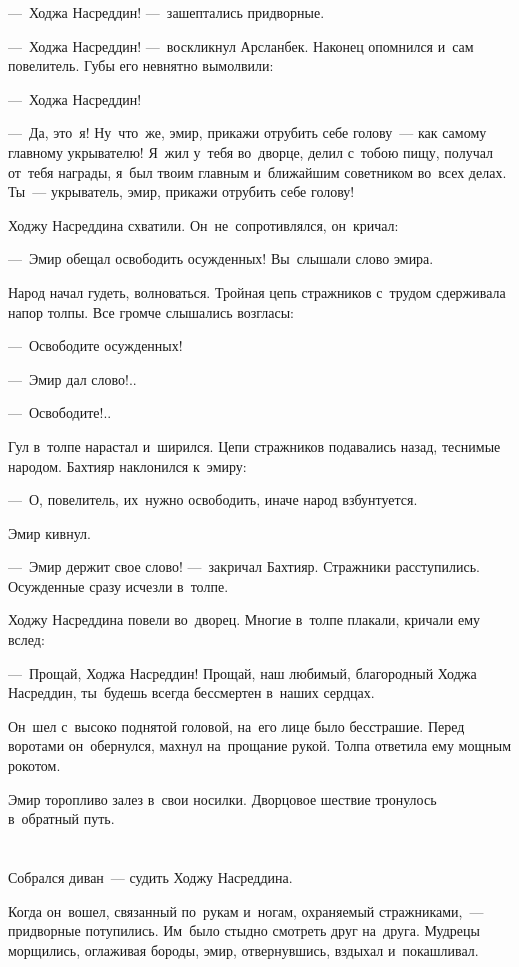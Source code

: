 \documentclass[12pt,a4paper]{book}
\begin{document}
—~Ходжа Насреддин! —~зашептались придворные.

—~Ходжа Насреддин! —~воскликнул Арсланбек. Наконец опомнился и~сам повелитель. Губы его невнятно вымолвили:

—~Ходжа Насреддин!

—~Да, это~я! Ну~что~же, эмир, прикажи отрубить себе голову~— как самому главному укрывателю! Я~жил у~тебя во~дворце, делил с~тобою пищу, получал от~тебя награды, я~был твоим главным и~ближайшим советником во~всех делах. Ты~— укрыватель, эмир, прикажи отрубить себе голову!

Ходжу Насреддина схватили. Он~не~сопротивлялся, он~кричал:

—~Эмир обещал освободить осужденных! Вы~слышали слово эмира.

Народ начал гудеть, волноваться. Тройная цепь стражников с~трудом сдерживала напор толпы. Все громче слышались возгласы:

—~Освободите осужденных!

—~Эмир дал слово!..

—~Освободите!..

Гул в~толпе нарастал и~ширился. Цепи стражников подавались назад, теснимые народом. Бахтияр наклонился к~эмиру:

—~О, повелитель, их~нужно освободить, иначе народ взбунтуется.

Эмир кивнул.

—~Эмир держит свое слово! —~закричал Бахтияр. Стражники расступились. Осужденные сразу исчезли в~толпе.

Ходжу Насреддина повели во~дворец. Многие в~толпе плакали, кричали ему вслед:

—~Прощай, Ходжа Насреддин! Прощай, наш любимый, благородный Ходжа Насреддин, ты~будешь всегда бессмертен в~наших сердцах.

Он~шел с~высоко поднятой головой, на~его лице было бесстрашие. Перед воротами он~обернулся, махнул на~прощание рукой. Толпа ответила ему мощным рокотом.

Эмир торопливо залез в~свои носилки. Дворцовое шествие тронулось в~обратный путь.


\chapter{}

Собрался диван~— судить Ходжу Насреддина.

Когда он~вошел, связанный по~рукам и~ногам, охраняемый стражниками,~— придворные потупились. Им~было стыдно смотреть друг на~друга. Мудрецы морщились, оглаживая бороды, эмир, отвернувшись, вздыхал и~покашливал.
\end{document}
